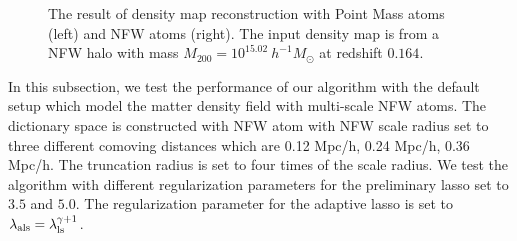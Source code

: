 \documentclass[twocolumn]{aastex62}
\begin{document}
\begin{figure}[!t]
\centering
{}
\caption{The result of density map reconstruction with  Point Mass atoms (left) and  NFW atoms (right). The input density
        map is from a NFW halo with mass $M_{200}=10^{15.02} ~h^{-1}M_{\odot}$ at redshift $0.164$.
        } \label{fig-lassoVsadaLasso}
\end{figure}


In this subsection, we test the performance of our algorithm with the default setup which model the matter density
field with multi-scale NFW atoms. The dictionary space is constructed with NFW atom with NFW scale radius set to
three different comoving distances which are 0.12 Mpc/h, 0.24 Mpc/h, 0.36 Mpc/h. The truncation radius is set to
four times of the scale radius.
We test the algorithm with different regularization parameters for the preliminary lasso set to $3.5$ and $5.0$. The
regularization parameter for the adaptive lasso is set to $\lambda_{\rm{als}}=\lambda_{\rm{ls}}^{\gamma+1}$.
\end{document}
